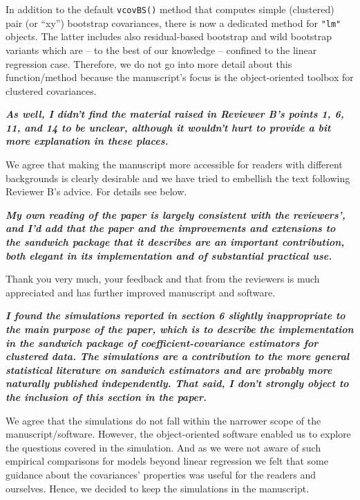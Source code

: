 \documentclass[10pt,a4paper]{article}
\begin{document}
In addition to the default \texttt{vcovBS()} method that computes simple (clustered)
pair (or ``xy'') bootstrap covariances, there is now a dedicated method for \texttt{"lm"}
objects. The latter includes also residual-based bootstrap and wild bootstrap variants
which are -- to the best of our knowledge -- confined to the linear regression case.
Therefore, we do not go into more detail about this function/method because the manuscript's
focus is the object-oriented toolbox for clustered covariances.

\medskip

\textbf{\textit{As well, I didn't find the material raised in Reviewer B's points 1, 6, 11,
and 14 to be unclear, although it wouldn't hurt to provide a bit more
explanation in these places.}}

\medskip

We agree that making the manuscript more accessible for readers with different backgrounds is
clearly desirable and we have tried to embellish the text following Reviewer B's advice.
For details see below.

\medskip

\textbf{\textit{My own reading of the paper is largely consistent with the reviewers', and
I'd add that the paper and the improvements and extensions to the sandwich
package that it describes are an important contribution, both elegant in its
implementation and of substantial practical use.}}

\medskip

Thank you very much, your feedback and that from the reviewers is much appreciated
and has further improved manuscript and software.

\medskip

\textbf{\textit{I found the simulations reported in section 6 slightly inappropriate to the
main purpose of the paper, which is to describe the implementation in the
sandwich package of coefficient-covariance estimators for clustered data. 
The simulations are a contribution to the more general statistical
literature on sandwich estimators and are probably more naturally published
independently.  That said, I don't strongly object to the inclusion of this
section in the paper.}}

\medskip

We agree that the simulations do not fall within the narrower scope of the manuscript/software.
However, the object-oriented software enabled us to explore the questions covered in the
simulation. And as we were not aware of such empirical comparisons for models beyond
linear regression we felt that some guidance about the covariances' properties was useful
for the readers and ourselves. Hence, we decided to keep the simulations in the manuscript.
\end{document}
